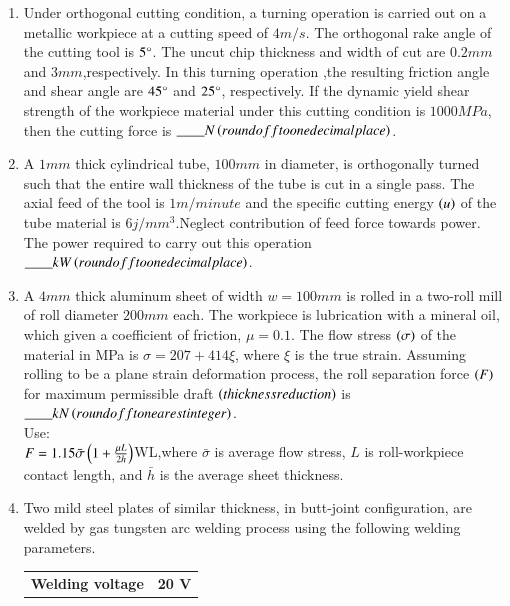 \documentclass[journal]{IEEEtran}
\begin{document}
\begin{enumerate}
     \item Under orthogonal cutting condition, a turning operation is carried out on a metallic workpiece at a cutting speed of $4 m/s$. The orthogonal rake angle of the  cutting tool is $5\degree$. The uncut chip thickness and width of cut are $0.2 mm$ and $3 mm$,respectively. In this turning operation ,the resulting friction angle and shear angle are $45\degree$ and $25\degree$, respectively. If the dynamic yield shear strength of the workpiece material under this cutting condition is $1000 MPa$, then the cutting force is $\_\_\_\_N\left(round off to one decimal place\right)$.\\
     \item A $1 mm$ thick cylindrical tube, $100 mm$ in diameter, is orthogonally turned such that the entire wall thickness of the tube is cut in a single pass. The axial feed of the tool is $1 m/minute$ and the specific cutting energy $\left(u\right)$ of the tube material is $6 j/mm^{3}$.Neglect contribution of feed force towards power.  The power required to carry out this operation $\_\_\_\_ kW \left(round off to one decimal place\right)$.\\
     \item A $4 mm$ thick aluminum sheet of width $w=100 mm$ is rolled in a two-roll mill of roll diameter $200 mm$ each. The workpiece is lubrication with a mineral oil, which given a coefficient of friction, $\mu=0.1$. The flow stress $\left(\sigma\right)$ of the material in MPa is $\sigma=207+ 414 \xi$, where $\xi$ is the true strain. Assuming rolling to be a plane strain deformation process, the roll separation force $\left(F\right)$ for maximum permissible draft $\left(thickness reduction\right)$ is $\_\_\_\_kN \left(round off to nearest integer\right)$.\\
     Use:\\
     $F = 1.15 \Bar{\sigma} \left(1+\frac{\mu L}{2h}\right)$WL,where $\bar{\sigma}$ is average flow stress, $L$ is roll-workpiece contact length, and $\bar{h}$ is the average sheet thickness.\\
     \item Two mild steel plates of similar thickness, in butt-joint configuration, are welded by gas tungsten arc welding process using the following welding parameters.\\
\begin{table}[h!]
\centering
\renewcommand{\arraystretch}{1.5}
\begin{tabular}{|m{5cm}|m{3cm}|}
    \hline
    \textbf{Welding voltage} & \textbf{20 V} \\ 

\end{tabular}
\end{table}
\end{enumerate}
\end{document}
